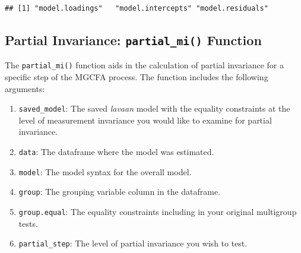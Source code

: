 \documentclass[
  man]{apa7}
\newenvironment{Shaded}{\begin{snugshade}}{\end{snugshade}}
\newcommand{\AttributeTok}[1]{\textcolor[rgb]{0.13,0.29,0.53}{#1}}
\newcommand{\CommentTok}[1]{\textcolor[rgb]{0.56,0.35,0.01}{\textit{#1}}}
\newcommand{\FunctionTok}[1]{\textcolor[rgb]{0.13,0.29,0.53}{\textbf{#1}}}
\newcommand{\NormalTok}[1]{#1}
\newcommand{\OtherTok}[1]{\textcolor[rgb]{0.56,0.35,0.01}{#1}}
\newcommand{\SpecialCharTok}[1]{\textcolor[rgb]{0.81,0.36,0.00}{\textbf{#1}}}
\newcommand{\StringTok}[1]{\textcolor[rgb]{0.31,0.60,0.02}{#1}}
\providecommand{\tightlist}{%
  \setlength{\itemsep}{0pt}\setlength{\parskip}{0pt}}
\begin{document}
\normalsize

\begin{verbatim}
## [1] "model.loadings"   "model.intercepts" "model.residuals"
\end{verbatim}

\newpage

\subsection{\texorpdfstring{Partial Invariance: \texttt{partial\_mi()} Function}{Partial Invariance: partial\_mi() Function}}\label{partial-invariance-partial_mi-function-1}

The \texttt{partial\_mi()} function aids in the calculation of partial invariance for a specific step of the MGCFA process. The function includes the following arguments:

\begin{enumerate}
\def\labelenumi{\arabic{enumi})}
\tightlist
\item
  \texttt{saved\_model}: The saved \emph{lavaan} model with the equality constraints at the level of measurement invariance you would like to examine for partial invariance.
\item
  \texttt{data}: The dataframe where the model was estimated.
\item
  \texttt{model}: The model syntax for the overall model.
\item
  \texttt{group}: The grouping variable column in the dataframe.
\item
  \texttt{group.equal}: The equality constraints including in your original multigroup tests.
\item
  \texttt{partial\_step}: The level of partial invariance you wish to test.
\end{enumerate}

\small

\begin{Shaded}
\end{Shaded}
\end{document}

